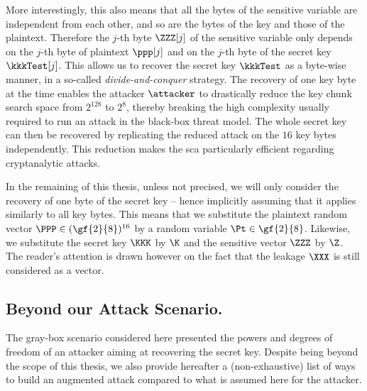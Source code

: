 More interestingly, this also means that all the bytes of the sensitive variable are independent from each other, and so are the bytes of the key and those of the plaintext.
Therefore the \(j\)-th byte \(\ZZZ[j]\) of the sensitive variable only depends on the \(j\)-th byte of plaintext \(\ppp[j]\) and on the \(j\)-th byte of the secret key \(\kkkTest[j]\).
This allows us to recover the secret key \(\kkkTest\) as a byte-wise manner, in a so-called \emph{divide-and-conquer} strategy.
The recovery of one key byte at the time enables the attacker \(\attacker\) to drastically reduce the key chunk search space from \(2^{128}\) to \(2^8\), thereby breaking the high complexity usually required to run an attack in the black-box threat model.
The whole secret key can then be recovered by replicating the reduced attack on the \(16\) key bytes independently.
This reduction makes the \gls{sca} particularly efficient regarding cryptanalytic attacks.

In the remaining of this thesis, unless not precised, we will only consider the recovery of one byte of the secret key -- hence implicitly assuming that it applies similarly to all key bytes.
This means that we substitute the plaintext random vector \(\PPP \in (\gf{2}{8})^{16}\) by a random variable \(\Pt \in \gf{2}{8}\).
Likewise, we substitute the secret key \(\KKK\) by \(\K\) and the sensitive vector \(\ZZZ\) by \(\Z\).
The reader's attention is drawn however on the fact that the leakage \(\XXX\) is still considered as a vector.

\subsection{Beyond our Attack Scenario.}
\label{sec:beyond_scenario}
The gray-box scenario considered here presented the powers and degrees of freedom of an attacker aiming at recovering the secret key.
Despite being beyond the scope of this thesis, we also provide hereafter a (non-exhaustive) list of ways to build an augmented attack compared to what is assumed here for the attacker.


